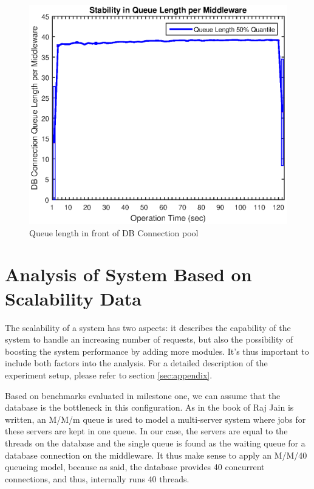 \documentclass[11pt]{article}
\begin{document}
\begin{figure}
\centering
\includegraphics[width=0.6\linewidth]{figures/stability_2/queue_length}
\caption{Queue length in front of DB Connection pool}
\label{fig:queue_length}
\end{figure}

\section{Analysis of System Based on Scalability Data}\label{sec:analysis-scalability}

The scalability of a system has two aspects: it describes the capability of the system to handle an increasing number of requests, but also the possibility of boosting the system performance by adding more modules. It's thus important to include both factors into the analysis. For a detailed description of the experiment setup, please refer to section \ref{sec:appendix}. 

Based on benchmarks evaluated in milestone one, we can assume that the database is the bottleneck in this configuration. As in the book of Raj Jain is written, an M/M/m queue is used to model a multi-server system where jobs for these servers are kept in one queue. In our case, the servers are equal to the threads on the database and the single queue is found as the waiting queue for a database connection on the middleware. It thus make sense to apply an M/M/40 queueing model, because as said, the database provides 40 concurrent connections, and thus, internally runs 40 threads. 
\end{document}
